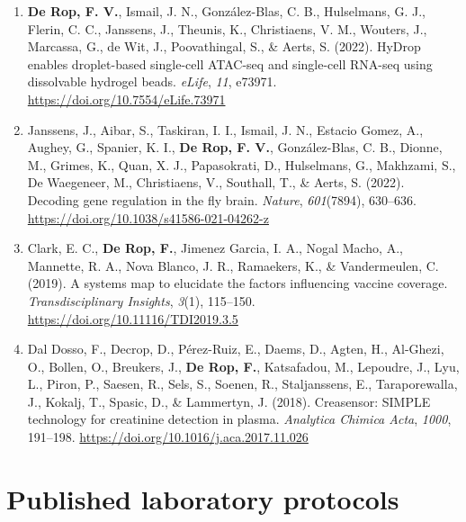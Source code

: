 \begin{enumerate}[leftmargin=*,itemsep=0.5\baselineskip]
\item \textbf{De Rop, F. V.}, Ismail, J. N., Gonz\'alez-Blas, C. B., Hulselmans, G. J., Flerin, C. C., Janssens, J., Theunis, K., Christiaens, V. M., Wouters, J., Marcassa, G., de Wit, J., Poovathingal, S., \& Aerts, S. (2022). HyDrop enables droplet-based single-cell ATAC-seq and single-cell RNA-seq using dissolvable hydrogel beads. \emph{eLife}, \emph{11}, e73971. \href{https://doi.org/10.7554/eLife.73971}{https://doi.org/10.7554/eLife.73971}

\item Janssens, J., Aibar, S., Taskiran, I. I., Ismail, J. N., Estacio Gomez, A., Aughey, G., Spanier, K. I., \textbf{De Rop, F. V.}, Gonz\'alez-Blas, C. B., Dionne, M., Grimes, K., Quan, X. J., Papasokrati, D., Hulselmans, G., Makhzami, S., De Waegeneer, M., Christiaens, V., Southall, T., \& Aerts, S. (2022). Decoding gene regulation in the fly brain. \emph{Nature}, \emph{601}(7894), 630--636. \href{https://doi.org/10.1038/s41586-021-04262-z}{https://doi.org/10.1038/s41586-021-04262-z}

\item Clark, E. C., \textbf{De Rop, F.}, Jimenez Garcia, I. A., Nogal Macho, A., Mannette, R. A., Nova Blanco, J. R., Ramaekers, K., \& Vandermeulen, C. (2019). A systems map to elucidate the factors influencing vaccine coverage. \emph{Transdisciplinary Insights}, \emph{3}(1), 115--150. \href{https://doi.org/10.11116/TDI2019.3.5}{https://doi.org/10.11116/TDI2019.3.5}

\item Dal Dosso, F., Decrop, D., P\'erez-Ruiz, E., Daems, D., Agten, H., Al-Ghezi, O., Bollen, O., Breukers, J., \textbf{De Rop, F.}, Katsafadou, M., Lepoudre, J., Lyu, L., Piron, P., Saesen, R., Sels, S., Soenen, R., Staljanssens, E., Taraporewalla, J., Kokalj, T., Spasic, D., \& Lammertyn, J. (2018). Creasensor: SIMPLE technology for creatinine detection in plasma. \emph{Analytica Chimica Acta}, \emph{1000}, 191--198. \href{https://doi.org/10.1016/j.aca.2017.11.026}{https://doi.org/10.1016/j.aca.2017.11.026}
\end{enumerate}

\section*{Published laboratory protocols}

